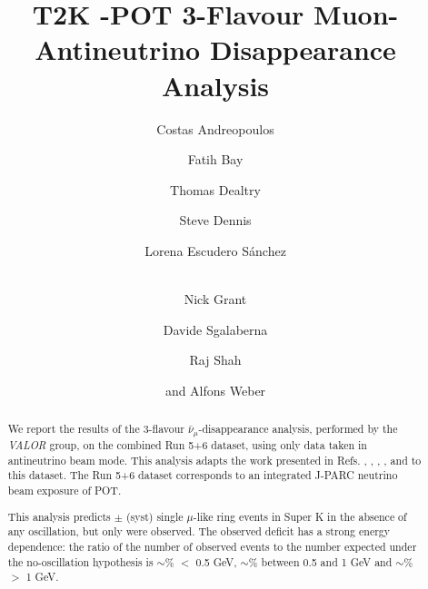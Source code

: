 %
%

\begin{frontmatter}

\title{
  T2K \TotalPot-POT 3-Flavour Muon-Antineutrino Disappearance Analysis
}

\vspace*{0.7cm}

\author[RAL,LIV]  {Costas Andreopoulos}
\author[ETHZ]     {Fatih Bay}
\author[RAL,OXF]  {Thomas Dealtry}
\author[RAL,WAR]  {Steve Dennis}
\author[IFIC]     {Lorena Escudero S\'anchez}
\author[LANCS,WAR]{\\Nick Grant}
\author[ETHZ]     {Davide Sgalaberna}
\author[RAL,OXF]  {Raj Shah}
\author[RAL,OXF]  {and Alfons Weber}

\address[RAL]   {Science \& Technology Facilities Council (STFC), Rutherford Appleton Laboratory,\\ Harwell Oxford Campus, OX11 0QX, UK}
\address[LIV]   {University of Liverpool, Physics Department,\\ Liverpool, L69 7ZE, UK} 
\address[ETHZ]  {ETH Zurich, Institute for Particle Physics,\\ 8092 Zurich, Switzerland}
\address[OXF]   {University of Oxford, Subdepartment of Particle Physics,\\ Oxford, OX1 3RH, UK}
\address[WAR]   {University of Warwick, Physics Department,\\ Coventry, CV4 7AL, UK}
\address[IFIC]  {CSIC and University of Valencia, Instituto de Fisica Corpuscular, \\ E-46071 Valencia, Spain}
\address[LANCS] {Lancaster University, Physics Department,\\ Lancaster, LA1 4YB, UK}

%
%

\begin{abstract}

We report the results of the
3-flavour $\bar{\nu}_{\mu}$-disappearance analysis, performed by the {\em VALOR} group,
on the combined Run 5+6 dataset, using only data taken in antineutrino beam mode.
This analysis adapts the work presented in Refs. 
\cite{OurRun1DisappAnalysis},
\cite{OurRun12DisappAnalysis}, 
\cite{OurRun12DisappAnalysis3Flavour},
\cite{OurRun123DisappAnalysis3Flavour},
\cite{OurRun1234aDisappAnalysis3Flavour} and
\cite{OurRun1234DisappAnalysis3Flavour}
to this dataset.
The Run 5+6 dataset corresponds to an integrated J-PARC neutrino beam
exposure of \TotalPot{} POT.

This analysis predicts \NskNoOscExpectation{} $\pm$ \NskNoOscExpectationError{} (syst)
single $\mu$-like ring events in Super K in the absence of any oscillation,
but only \NskObserved{} were observed. 
The observed deficit has a strong energy dependence: the ratio of the number of observed events to the 
number expected under the no-oscillation hypothesis is
$\sim$\NskRatioLowEnergy\% $<$ 0.5 GeV, 
$\sim$\NskRatioMidEnergy\% between 0.5 and 1 GeV and 
$\sim$\NskRatioHighEnergy\% $>$ 1 GeV. 


\end{abstract}
\end{frontmatter}
